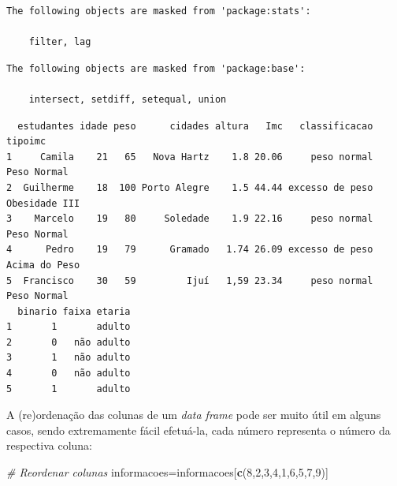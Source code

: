 \documentclass[12pt,brazil,oneside]{book}
\newenvironment{Shaded}{\begin{snugshade}}{\end{snugshade}}
\newcommand{\CommentTok}[1]{\textcolor[rgb]{0.56,0.35,0.01}{\textit{#1}}}
\newcommand{\DecValTok}[1]{\textcolor[rgb]{0.00,0.00,0.81}{#1}}
\newcommand{\KeywordTok}[1]{\textcolor[rgb]{0.13,0.29,0.53}{\textbf{#1}}}
\newcommand{\NormalTok}[1]{#1}
\newcommand{\OperatorTok}[1]{\textcolor[rgb]{0.81,0.36,0.00}{\textbf{#1}}}
\newcommand{\StringTok}[1]{\textcolor[rgb]{0.31,0.60,0.02}{#1}}
\begin{document}
\begin{verbatim}
The following objects are masked from 'package:stats':

    filter, lag
\end{verbatim}

\begin{verbatim}
The following objects are masked from 'package:base':

    intersect, setdiff, setequal, union
\end{verbatim}

\begin{Shaded}
\end{Shaded}

\begin{verbatim}
  estudantes idade peso      cidades altura   Imc   classificacao       tipoimc
1     Camila    21   65   Nova Hartz    1.8 20.06     peso normal   Peso Normal
2  Guilherme    18  100 Porto Alegre    1.5 44.44 excesso de peso Obesidade III
3    Marcelo    19   80     Soledade    1.9 22.16     peso normal   Peso Normal
4      Pedro    19   79      Gramado   1.74 26.09 excesso de peso Acima do Peso
5  Francisco    30   59         Ijuí   1,59 23.34     peso normal   Peso Normal
  binario faixa etaria
1       1       adulto
2       0   não adulto
3       1   não adulto
4       0   não adulto
5       1       adulto
\end{verbatim}

A (re)ordenação das colunas de um \emph{data frame} pode ser muito útil
em alguns casos, sendo extremamente fácil efetuá-la, cada número
representa o número da respectiva coluna:

\begin{Shaded}
\begin{Highlighting}[]
\CommentTok{# Reordenar colunas}
\NormalTok{informacoes=informacoes[}\KeywordTok{c}\NormalTok{(}\DecValTok{8}\NormalTok{,}\DecValTok{2}\NormalTok{,}\DecValTok{3}\NormalTok{,}\DecValTok{4}\NormalTok{,}\DecValTok{1}\NormalTok{,}\DecValTok{6}\NormalTok{,}\DecValTok{5}\NormalTok{,}\DecValTok{7}\NormalTok{,}\DecValTok{9}\NormalTok{)]}
\end{Highlighting}
\end{Shaded}
\end{document}
